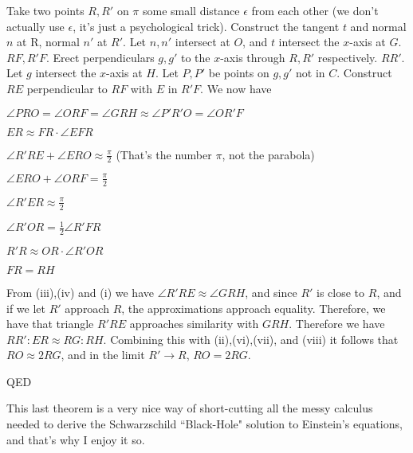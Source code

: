 \documentclass[12pt]{article}
\newcounter{lblfoo}
\begin{document}
Take two points $R,R'$ on $\pi$ some small distance $\epsilon$ from each other (we don't actually use $\epsilon$, it's just a psychological trick).  
Construct the tangent $t$ and normal $n$ at R, normal $n'$ at $R'$.  Let $n,n'$ intersect at $O$, and $t$ intersect the $x$-axis at $G$.   $RF,R'F$.  
Erect perpendiculars $g,g'$ to the $x$-axis through $R,R'$ respectively.   $RR'$.  Let $g$ intersect the $x$-axis at $H$. Let $P,P'$ be points on 
$g,g'$ not in $C$.  Construct $RE$ perpendicular to $RF$ with $E$ in $R'F$. We now have 
\begin{list}{) \addtocounter{lblfoo}{1} }{}
\item $\angle PRO = \angle ORF = \angle GRH \approx \angle P'R'O = \angle OR'F$
\item $ ER \approx FR \cdot \angle EFR $
\item $ \angle R'RE + \angle ERO \approx \frac{\pi}{2} $ (That's the number $\pi$, not the parabola)
\item $ \angle ERO + \angle ORF = \frac{\pi}{2} $ 
\item $ \angle R'ER \approx \frac{\pi}{2} $
\item $ \angle R'OR = \frac{1}{2} \angle R'FR $
\item $ R'R \approx OR \cdot \angle R'OR $
\item $ FR = RH $
\end{list}
From (iii),(iv) and (i) we have $\angle R'RE \approx \angle GRH$, and since $R'$ is close to $R$, and if we let $R'$ approach $R$, the approximations 
approach equality.  Therefore, we have that triangle $R'RE$ approaches similarity with $GRH$.  Therefore we have $RR':ER \approx RG:RH$.  
Combining this with (ii),(vi),(vii), and (viii) it follows that $RO \approx 2 RG$, and in the limit $R'\rightarrow R$, $RO = 2RG$.

QED

This last theorem is a very nice way of short-cutting all the messy calculus needed to derive the Schwarzschild ``Black-Hole" solution to Einstein's  equations, and that's why I enjoy it so.
\end{document}
